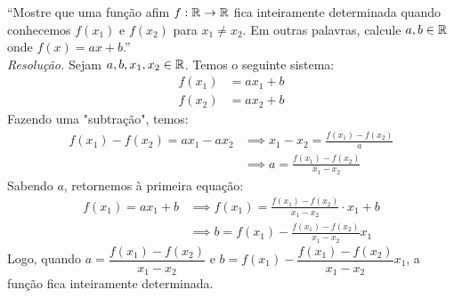 \enquote{Mostre que uma função afim $f: \mathbb R \rightarrow \mathbb R$ fica inteiramente determinada quando conhecemos $f(x_1)$ e $f(x_2)$ para $x_1 \ne x_2$. Em outras palavras, calcule $a, b \in \mathbb R$ onde $f(x) = ax + b$.} \\
\emph{Resolução.} Sejam $a, b, x_1, x_2 \in \mathbb R$. Temos o seguinte sistema:
\begin{align*}
    f(x_1) &= ax_1 + b \\
    f(x_2) &= ax_2 + b 
\end{align*} 
Fazendo uma "subtração", temos:
\begin{align*}
    f(x_1) - f(x_2) = ax_1 - ax_2 & \implies
    x_1 - x_2 = \frac{f(x_1) - f(x_2)}{a} \\ & \implies
    a = \frac{f(x_1) - f(x_2)}{x_1 - x_2}
\end{align*}
Sabendo $a$, retornemos à primeira equação:
\begin{align*}
    f(x_1) = ax_1 + b & \implies f(x_1) = \frac{f(x_1) - f(x_2)}{x_1 - x_2} \cdot x_1 + b \\ & \implies 
    b = f(x_1) - \frac{f(x_1) - f(x_2)}{x_1 - x_2} x_1
\end{align*}
Logo, quando $a = \dfrac{f(x_1) - f(x_2)}{x_1 - x_2}$ e $b = f(x_1) - \dfrac{f(x_1) - f(x_2)}{x_1 - x_2} x_1$, a função fica inteiramente determinada.